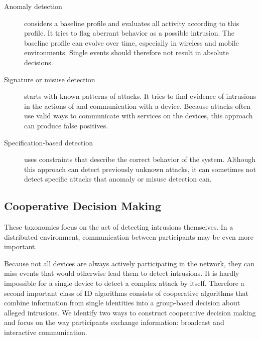 \documentclass[3p,times,procedia]{elsarticle}
\begin{document}
\begin{description}
  
  \item[Anomaly detection] considers a baseline profile and evaluates all
  activity according to this profile. It tries to flag aberrant behavior as a
  possible intrusion. The baseline profile can evolve over time, especially in
  wireless and mobile environments. Single events should therefore not result
  in absolute decisions.
  
  \item[Signature or misuse detection] starts with known patterns of attacks.
  It tries to find evidence of intrusions in the actions of and communication
  with a device. Because attacks often use valid ways to communicate with
  services on the devices, this approach can produce false positives.
  
  \item[Specification-based detection] uses constraints that describe the
  correct behavior of the system. Although this approach can detect previously
  unknown attacks, it can sometimes not detect specific attacks that anomaly or
  misuse detection can.
  
\end{description}

\subsection{Cooperative Decision Making}
\label{coorperative}

These taxonomies focus on the act of detecting intrusions themselves. In a
distributed environment, communication between participants may be even more
important.

Because not all devices are always actively participating in the network, they
can miss events that would otherwise lead them to detect intrusions. It is
hardly impossible for a single device to detect a complex attack by itself.
Therefore a second important class of ID algorithms consists of cooperative
algorithms that combine information from single identities into a group-based
decision about alleged intrusions. We identify two ways to construct
cooperative decision making and focus on the way participants exchange
information: broadcast and interactive communication.
\end{document}
